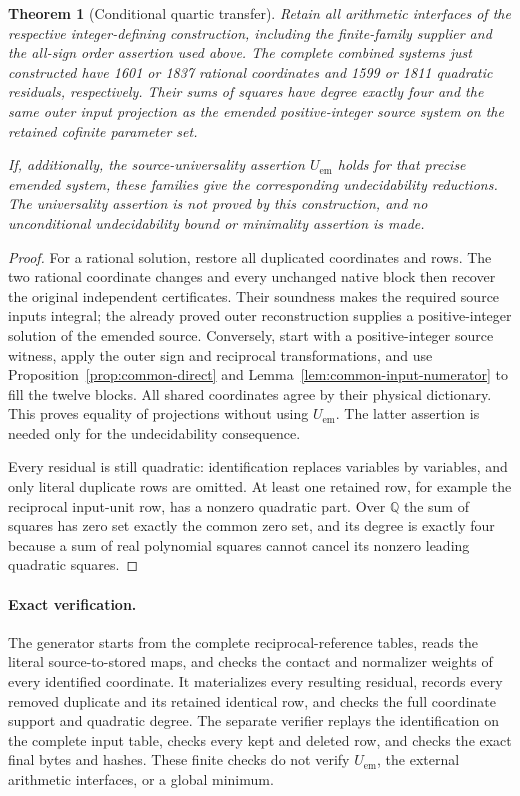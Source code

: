 \documentclass[11pt]{article}
\newtheorem{theorem}{Theorem}
\begin{document}
\begin{theorem}[Conditional quartic transfer]\label{thm:common-transfer}
Retain all arithmetic interfaces of the respective integer-defining
construction, including the finite-family supplier and the all-sign
order assertion used above.  The complete combined systems just
constructed have 1601 or 1837 rational coordinates and 1599 or 1811
quadratic residuals, respectively.  Their sums of squares have degree
exactly four and the same outer input projection as the emended
positive-integer source system on the retained cofinite parameter set.

If, additionally, the source-universality assertion
\(U_{\mathrm{em}}\) holds for that precise emended system, these
families give the corresponding undecidability reductions.  The
universality assertion is not proved by this construction, and no
unconditional undecidability bound or minimality assertion is made.
\end{theorem}
\begin{proof}
For a rational solution, restore all duplicated coordinates and rows.
The two rational coordinate changes and every unchanged native block
then recover the original independent certificates.  Their soundness
makes the required source inputs integral; the already proved outer
reconstruction supplies a positive-integer solution of the emended
source.  Conversely, start with a positive-integer source witness,
apply the outer sign and reciprocal transformations, and use
Proposition~\ref{prop:common-direct} and
Lemma~\ref{lem:common-input-numerator} to fill the twelve blocks.
All shared coordinates agree by their physical dictionary.  This
proves equality of projections without using \(U_{\mathrm{em}}\).
The latter assertion is needed only for the undecidability consequence.

Every residual is still quadratic: identification replaces variables
by variables, and only literal duplicate rows are omitted.  At least
one retained row, for example the reciprocal input-unit row, has a
nonzero quadratic part.  Over \(\mathbb Q\) the sum of squares has
zero set exactly the common zero set, and its degree is exactly four
because a sum of real polynomial squares cannot cancel its nonzero
leading quadratic squares.
\end{proof}

\paragraph{Exact verification.}
The generator starts from the complete reciprocal-reference tables,
reads the literal source-to-stored maps, and checks the contact and
normalizer weights of every identified coordinate.  It materializes
every resulting residual, records every removed duplicate and its
retained identical row, and checks the full coordinate support and
quadratic degree.  The separate verifier replays the identification on
the complete input table, checks every kept and deleted row, and checks
the exact final bytes and hashes.  These finite checks do not verify
\(U_{\mathrm{em}}\), the external arithmetic interfaces, or a global
minimum.
\end{document}
